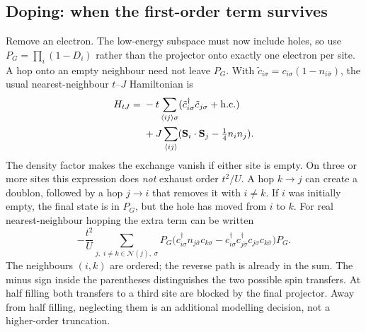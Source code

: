 \subsection{Doping: when the first-order term survives}
Remove an electron. The low-energy subspace must now include holes, so
use $P_G=\prod_i(1-D_i)$ rather than the projector onto exactly one
electron per site. A hop onto an empty neighbour need not leave $P_G$.
With $\tilde c_{i\sigma}=c_{i\sigma}(1-n_{i\bar\sigma})$, the
usual nearest-neighbour $t$--$J$ Hamiltonian is
\begin{align}
 H_{tJ}={}&-t\sum_{\langle ij\rangle\sigma}
  (\tilde c^\dagger_{i\sigma}\tilde c_{j\sigma}+\mathrm{h.c.})\nonumber\\
 &+J\sum_{\langle ij\rangle}
   (\mathbf{S}_i\cdot\mathbf{S}_j-\tfrac14 n_i n_j).
\end{align}
The density factor makes the exchange vanish if either site is empty.
On three or more sites this expression does \emph{not} exhaust
order $t^2/U$. A hop $k\to j$ can create a doublon, followed by a hop
$j\to i$ that removes it with $i\ne k$. If $i$ was initially empty,
the final state is in $P_G$, but the hole has moved from $i$ to $k$.
For real nearest-neighbour hopping the extra term can be written
\[
 -\frac{t^2}{U}\!
 \sum_{j,\;i\ne k\in\mathcal{N}(j),\;\sigma}
 P_G\big(c^\dagger_{i\sigma}n_{j\bar\sigma}c_{k\sigma}
 -c^\dagger_{i\sigma}c^\dagger_{j\bar\sigma}
 c_{j\sigma}c_{k\bar\sigma}\big)P_G .
\]
The neighbours $(i,k)$ are ordered; the reverse path is already in
the sum. The minus sign inside the parentheses distinguishes the two
possible spin transfers. At half filling both transfers to a third site
are blocked by the final projector. Away from half filling, neglecting
them is an additional modelling decision, not a higher-order truncation.

